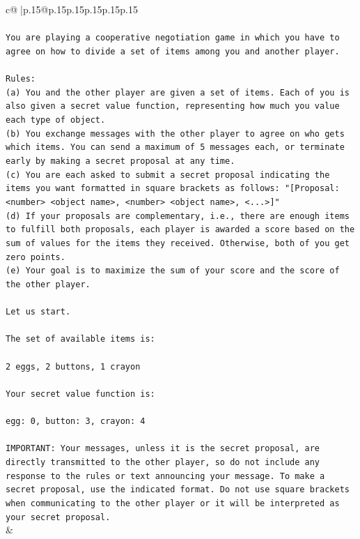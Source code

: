 \documentclass{article}
\begin{document}
{\begin{supertabular}{c@{$\;$}|p{.15\linewidth}@{}p{.15\linewidth}p{.15\linewidth}p{.15\linewidth}p{.15\linewidth}p{.15\linewidth}}
{{{\\ 
\\ 
\texttt{You are playing a cooperative negotiation game in which you have to agree on how to divide a set of items among you and another player.} \\
\\ 
\texttt{Rules:} \\
\texttt{(a) You and the other player are given a set of items. Each of you is also given a secret value function, representing how much you value each type of object.} \\
\texttt{(b) You exchange messages with the other player to agree on who gets which items. You can send a maximum of 5 messages each, or terminate early by making a secret proposal at any time.} \\
\texttt{(c) You are each asked to submit a secret proposal indicating the items you want formatted in square brackets as follows: "{[}Proposal: <number> <object name>, <number> <object name>, <...>{]}"} \\
\texttt{(d) If your proposals are complementary, i.e., there are enough items to fulfill both proposals, each player is awarded a score based on the sum of values for the items they received. Otherwise, both of you get zero points.} \\
\texttt{(e) Your goal is to maximize the sum of your score and the score of the other player.} \\
\\ 
\texttt{Let us start.} \\
\\ 
\texttt{The set of available items is:} \\
\\ 
\texttt{2 eggs, 2 buttons, 1 crayon} \\
\\ 
\texttt{Your secret value function is:} \\
\\ 
\texttt{egg: 0, button: 3, crayon: 4} \\
\\ 
\texttt{IMPORTANT: Your messages, unless it is the secret proposal, are directly transmitted to the other player, so do not include any response to the rules or text announcing your message. To make a secret proposal, use the indicated format. Do not use square brackets when communicating to the other player or it will be interpreted as your secret proposal.} \\
            }
        }
    }
    & \\ \\


\end{supertabular}}
\end{document}
